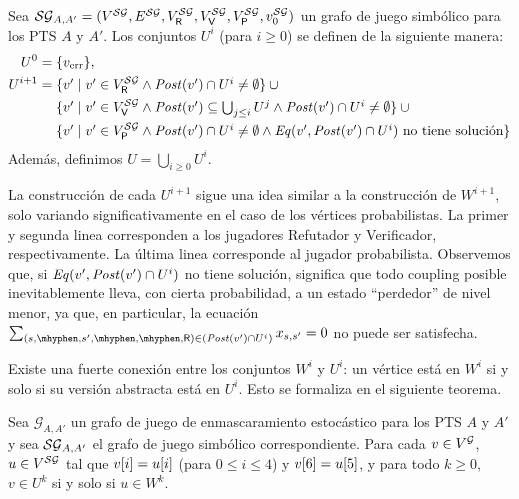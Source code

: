 \begin{definition}\label{def:U_prob}
  Sea
  $\SymbG_{A,A'} = ( V^{\SymbG},  E^{\SymbG}, V^{\SymbG}_\Refuter, V^{\SymbG}_\Verifier, V^{\SymbG}_\Probabilistic, v_0^{\SymbG} )$
  un grafo de juego simbólico para los PTS $A$ y $A'$.
  Los conjuntos $U^i$ (para $i \geq 0$) se definen de la siguiente manera:
  {\small%
  \begin{align*}
    U^0 = {} & \{\ErrorSt\},  \label{def:U_probji}\\
    U^{i+1} = {}
    & \textstyle 
    \{v' \mid v' \in V^\SymbG_\Refuter \wedge \post(v') \cap U^{i} \neq \emptyset \} \cup {}\\
    & \textstyle 
    \{v' \mid v' \in V^\SymbG_\Verifier \wedge \post(v') \subseteq \bigcup_{j\leq i}U^{j} \wedge \post(v') \cap U^i \neq \emptyset  \}  \cup {}\\
    & \textstyle 
    \{v' \mid v' \in V^\SymbG_\Probabilistic \wedge \post(v') \cap U^{i} \neq \emptyset \wedge \Eq(v', \post(v') \cap U^{i}) \text{ no tiene solución}\}
  \end{align*}
  }%
  Además, definimos $U = \bigcup_{i \geq 0} U^i$.
\end{definition}
%

La construcción de cada $U^{i+1}$ sigue una idea similar a la construcción de $W^{i+1}$, solo variando significativamente en el caso de los vértices probabilistas.  La primer y segunda linea corresponden a los jugadores Refutador y Verificador, respectivamente. La última linea corresponde al jugador probabilista.
%
Observemos que, si $\Eq(v', \post(v') \cap U^{i})$ no tiene solución, significa que todo coupling posible inevitablemente lleva, con cierta probabilidad, a un estado ``perdedor'' de nivel menor, ya que, en
particular, la ecuación
$\sum_{(s, \mhyphen, s', \mhyphen, \mhyphen, \Refuter) \in (\post(v') {\cap} U^{i})} x_{s,s'} = 0$
no puede ser satisfecha.

Existe una fuerte conexión entre los conjuntos  $W^i$ y $U^i$: un vértice está en $W^i$ si y solo si su versión abstracta está en $U^i$.  Esto se formaliza en el siguiente teorema.
	
\begin{theorem}\label{th:U-and-W}
  Sea $\mathcal{G}_{A,A'}$ un grafo de juego de enmascaramiento estocástico
  para los PTS $A$ y $A'$ y sea $\SymbG_{A,A'}$
  el grafo de juego simbólico correspondiente.
%
  Para cada $v \in V^\StochG$, $u \in V^\SymbG$ tal que 
  $\pr{i}{v} = \pr{i}{u}$ (para $0 \leq i \leq 4$) y
  $\pr{6}{v} = \pr{5}{u}$, y para todo $k\geq 0$,
  $v \in U^k$ si y solo si $u \in W^k$.
\end{theorem}

